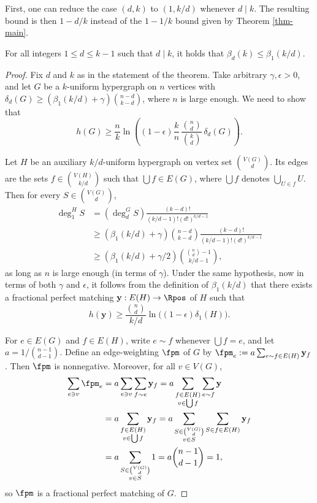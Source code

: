 \documentclass[11pt]{article}
\newcommand{\fpmy}{\mathbf{y}}
\begin{document}
First, one can reduce the case $(d,k)$ to $(1,k/d)$ whenever $d\mid k$. The resulting bound is then $1-d/k$ instead of the $1-1/k$ bound given by Theorem \ref{thm-main}.

\begin{theorem}\label{thm-ent-div}
    For all integers $1\le d\le k-1$ such that $d\mid k$, it holds that $\beta_d(k)\le \beta_1(k/d)$.
\end{theorem}

\begin{proof}
    Fix $d$ and $k$ as in the statement of the theorem. Take arbitrary $\gamma,\epsilon>0$, and let $G$ be a $k$-uniform hypergraph on $n$ vertices with $\delta_d(G)\ge(\beta_1(k/d)+\gamma)\binom{n-d}{k-d}$, where $n$ is large enough. We need to show that
    $$h(G)\ge \frac{n}{k}\ln\left((1-\epsilon)\frac{k}{n}\,\frac{\binom{n}{d}}{\binom{k}{d}}\,\delta_d(G)\right).$$
    
    Let $H$ be an auxiliary $k/d$-uniform hypergraph on vertex set $\binom{V(G)}{d}$. Its edges are the sets $f\in\binom{V(H)}{k/d}$ such that $\bigcup f\in E(G)$, where $\bigcup f$ denotes $\bigcup_{U\in f} U$. Then for every $S\in \binom{V(G)}{d}$,
    \begin{align*}
        \deg^H_1S &=\left(\deg_d^GS\right)\frac{(k-d)!}{(k/d-1)!(d!)^{k/d-1}} \\
        &\ge (\beta_1(k/d)+\gamma)\binom{n-d}{k-d}\frac{(k-d)!}{(k/d-1)!(d!)^{k/d-1}} \\
        &\ge (\beta_1(k/d)+\gamma/2)\binom{\binom{n}{d}-1}{k/d-1},
    \end{align*}
    as long as $n$ is large enough (in terms of $\gamma$). Under the same hypothesis, now in terms of both $\gamma$ and $\epsilon$, it follows from the definition of $\beta_1(k/d)$ that there exists a fractional perfect matching $\fpmy:E(H)\to\Rpos$ of $H$ such that
    \begin{equation}\label{eq-ent-div}
        h(\fpmy)\ge \frac{\binom{n}{d}}{k/d}\ln\Big((1-\epsilon)\delta_1(H)\Big).
    \end{equation}

    For $e\in E(G)$ and $f\in E(H)$, write $e\sim f$ whenever $\bigcup f=e$, and let $a=1/\binom{n-1}{d-1}$. Define an edge-weighting $\fpm$ of $G$ by $\fpm_e:= a\sum_{e\sim f\in E(H)} \fpmy_f$. Then $\fpm$ is nonnegative. Moreover, for all $v\in V(G)$,
    \begin{align*}
        \sum_{e\ni v}\fpm_e &= a\sum_{e\ni v}\sum_{f\sim e} \fpmy_f = a\sum_{\substack{f\in E(H) \\ v\in\bigcup f}}\sum_{e\sim f}\fpmy \\
        &= a\sum_{\substack{f\in E(H) \\ v\in\bigcup f}}\fpmy_f = a\sum_{\substack{S\in\binom{V(G)}{d} \\ v\in S}} \sum_{S\in f\in E(H)} \fpmy_f \\
        &= a\sum_{\substack{S\in\binom{V(G)}{d} \\ v\in S}}1 = a\binom{n-1}{d-1} = 1,
    \end{align*}
    so $\fpm$ is a fractional perfect matching of $G$.
    

\end{proof}
\end{document}
